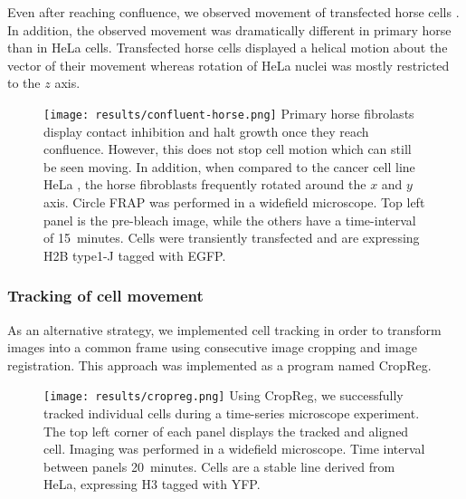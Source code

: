       Even after reaching confluence, we observed movement of transfected horse cells .
      In addition, the observed movement was dramatically different in primary horse than in HeLa cells.
      Transfected horse cells displayed a helical motion about the vector of their movement
      whereas rotation of HeLa nuclei was mostly restricted to the $z$ axis.

      \begin{figure}
        \centering
        \texttt{[image: results/confluent-horse.png]}
          {
            Primary horse fibrolasts display contact inhibition and halt growth
            once they reach confluence. However, this does not stop cell
            motion which can still be seen moving. In addition, when compared
            to the cancer cell line HeLa ,
            the horse fibroblasts frequently rotated around the $x$ and $y$
            axis. Circle FRAP was performed in a widefield microscope.
            Top left panel is the pre-bleach image, while the others have a
            time-interval of 15~minutes. Cells were transiently transfected
            and are expressing H2B type1-J tagged with EGFP.
          }
        \label{fig:kill-frap:confluent-horse}
      \end{figure}

    \subsubsection{Tracking of cell movement}

      As an alternative strategy, we implemented cell tracking
      in order to transform images into a common frame using
      consecutive image cropping and image registration.
      This approach was implemented as a program named CropReg.

      \begin{figure}
        \centering
        \texttt{[image: results/cropreg.png]}
          {
            Using CropReg, we successfully tracked individual cells during
            a time-series microscope experiment. The top left corner of each
            panel displays the tracked and aligned cell. Imaging was performed
            in a widefield microscope. Time interval between panels 20~minutes.
            Cells are a stable line derived from HeLa, expressing H3 tagged
            with YFP.
          }
        \label{fig:kill-frap:cropreg}
      \end{figure}

